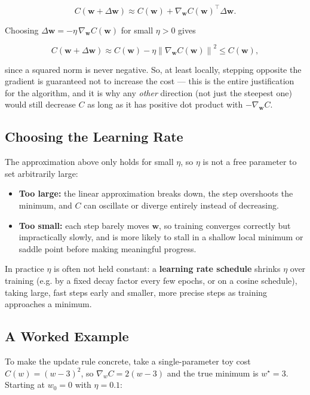 \documentclass[11pt]{article}
\begin{document}
\[
  C(\mathbf{w} + \Delta\mathbf{w}) \approx C(\mathbf{w})
  + \nabla_{\mathbf{w}} C(\mathbf{w})^\top \Delta\mathbf{w}.
\]

Choosing $\Delta\mathbf{w} = -\eta \, \nabla_{\mathbf{w}} C(\mathbf{w})$ for
small $\eta > 0$ gives

\[
  C(\mathbf{w} + \Delta\mathbf{w}) \approx C(\mathbf{w})
  - \eta \left\lVert \nabla_{\mathbf{w}} C(\mathbf{w}) \right\rVert^2
  \le C(\mathbf{w}),
\]

since a squared norm is never negative. So, at least locally, stepping
opposite the gradient is guaranteed not to increase the cost --- this is
the entire justification for the algorithm, and it is why any \emph{other}
direction (not just the steepest one) would still decrease $C$ as long as
it has positive dot product with $-\nabla_{\mathbf{w}} C$.

\subsection{Choosing the Learning Rate}

The approximation above only holds for small $\eta$, so $\eta$ is not a
free parameter to set arbitrarily large:

\begin{itemize}
  \item \textbf{Too large:} the linear approximation breaks down, the
        step overshoots the minimum, and $C$ can oscillate or diverge
        entirely instead of decreasing.
  \item \textbf{Too small:} each step barely moves $\mathbf{w}$, so
        training converges correctly but impractically slowly, and is
        more likely to stall in a shallow local minimum or saddle point
        before making meaningful progress.
\end{itemize}

In practice $\eta$ is often not held constant: a \textbf{learning rate
schedule} shrinks $\eta$ over training (e.g. by a fixed decay factor every
few epochs, or on a cosine schedule), taking large, fast steps early and
smaller, more precise steps as training approaches a minimum.

\subsection{A Worked Example}

To make the update rule concrete, take a single-parameter toy cost
$C(w) = (w - 3)^2$, so $\nabla_w C = 2(w - 3)$ and the true minimum is
$w^\star = 3$. Starting at $w_0 = 0$ with $\eta = 0.1$:
\end{document}

